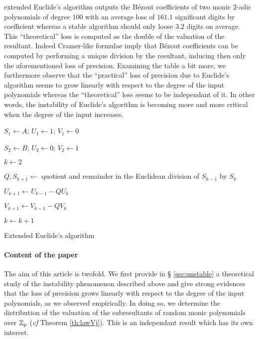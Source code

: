 \documentclass{article}
\begin{document}
extended Euclide's algorithm outputs the B\'ezout coefficients of two 
monic $2$-adic polynomials of degree $100$ with an average loss of 
$161.1$ significant digits by coefficient whereas a stable 
algorithm should only loose $3.2$ digits on average. This 
``theoretical'' loss is computed as the double of the valuation of the 
resultant. Indeed Cramer-like formulae imply that B\'ezout coefficients 
can be computed by performing a unique division by the resultant, 
inducing then only the aforementioned loss of precision. Examining the 
table a bit more, we furthermore observe that the ``practical'' loss of 
precision due to Euclide's algorithm seems to grow linearly with respect 
to the degree of the input polynomials whereas the ``theoretical'' loss 
seems to be independant of it. In other words, the instability of 
Euclide's algorithm is becoming more and more critical when the degree 
of the input increases.
%
\begin{algorithm}

  \BlankLine

  $S_1 \leftarrow A$; $U_1 \leftarrow 1$; $V_1 \leftarrow 0$

  $S_2 \leftarrow B$; $U_2 \leftarrow 0$; $V_2 \leftarrow 1$

  $k \leftarrow 2$

    {$Q, S_{k+1} \leftarrow$ quotient and remainder in the Euclidean
     division of $S_{k-1}$ by $S_k$

     $U_{k+1} \leftarrow U_{k-1} - Q U_k$

     $V_{k+1} \leftarrow V_{k-1} - Q V_k$

     $k \leftarrow k+1$}

\caption{Extended Euclide's algorithm}
\label{algo:Euclide}
\end{algorithm}

\paragraph{Content of the paper}

The aim of this article is twofold. We first provide in \S 
\ref{sec:unstable} a theoretical study of the instability phenomenon 
described above and give strong evidences that the loss of precision 
grows linearly with respect to the degree of the input polynomials, as we 
observed empirically. In doing so, we determine the distribution of the 
valuation of the subresultants of random monic polynomials over $\mathbb Z_p$ 
(\emph{cf} Theorem \ref{th:lawVj}). This is an independant result which 
has its own interest.
\end{document}
